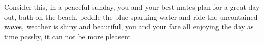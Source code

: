 Consider this, in a peaceful sunday, you and your best mates plan for a great day out, bath on the beach, peddle the blue sparking water and ride the uncontained waves, weather is shiny and beautiful, you and your fare all enjoying the day as time passby, it can not be more pleasent 
